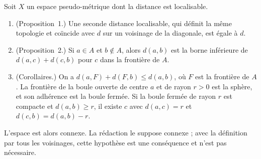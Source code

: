 \begin{encadre}
\begin{enonce}
Soit $X$ un espace pseudo-métrique dont la distance est localisable.
\begin{enumerate}
\item[a)] (Proposition~1.) Une seconde distance localisable, qui définit la même topologie et coïncide avec $d$ sur un voisinage de la diagonale, est égale à $d$.
\item[b)] (Proposition~2.) Si $a \in A$ et $b \notin A$, alors $d(a, b)$ est la borne inférieure de $d(a, c) + d(c, b)$ pour $c$ dans la frontière de $A$.
\item[c)] (Corollaires.) On a $d(a, F) + d(F, b) \leq d(a, b)$, où $F$ est la frontière de $A$. La frontière de la boule ouverte de centre $a$ et de rayon $r > 0$ est la sphère, et son adhérence est la boule fermée. Si la boule fermée de rayon $r$ est compacte et $d(a, b) \geq r$, il existe $c$ avec $d(a, c) = r$ et $d(c, b) = d(a, b) - r$.
\end{enumerate}
L'espace est alors connexe. La rédaction le suppose connexe ; avec la définition par tous les voisinages, cette hypothèse est une conséquence et n'est pas nécessaire.
\end{enonce}
\end{encadre}

